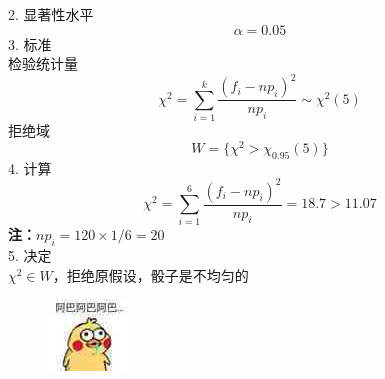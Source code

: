 \documentclass[a4paper]{ctexart}    %
\begin{document}
	2. 显著性水平
	\begin{equation*}
		\alpha = 0.05
	\end{equation*}
	3. 标准 \\
	检验统计量
	\begin{equation*}
		\chi^2 = \sum\limits_{i=1}^{k} \frac{(f_i - np_i)^2}{np_i} \sim \chi^2(5)
	\end{equation*}
	拒绝域
	\begin{equation*}
		W = \{\chi^2 > \chi_{0.95}(5)\}
	\end{equation*}
	4. 计算
	\begin{equation*}
		\chi^2 = \sum\limits_{i=1}^{6} \frac{(f_i - np_i)^2}{np_i} = 18.7 > 11.07
	\end{equation*}
	\textbf{注：}$ np_i = 120 \times 1/6 = 20 $\\
	5. 决定 \\
	$ \chi^2 \in W $，拒绝原假设，骰子是不均匀的 \\
	\begin{figure}[!htbp]
		\centering
		\includegraphics{abab.jpg}
	\end{figure}
	\newpage
\end{document}
